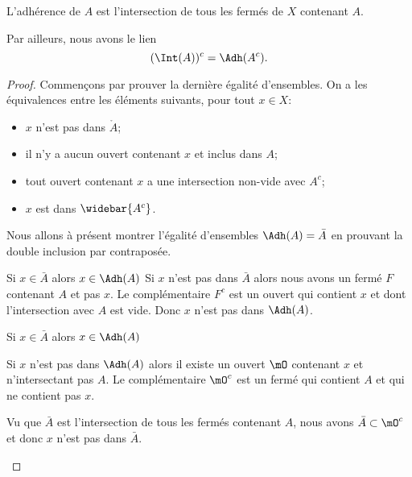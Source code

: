 \begin{lemma}       \label{LEMooILNCooOFZaTe}
    L'adhérence de \( A\) est l'intersection de tous les fermés de \( X\) contenant \( A\).

    Par ailleurs, nous avons le lien
    \begin{equation}
      (\Int(A))^c = \Adh(A^c).
    \end{equation}
\end{lemma}

\begin{proof}
    Commençons par prouver la dernière égalité d'ensembles. On a les équivalences entre les éléments suivants, pour tout $x \in X$:
    \begin{itemize}
    \item $x$ n'est pas dans $\mathring A$;
    \item il n'y a aucun ouvert contenant $x$ et inclus dans $A$;
    \item tout ouvert contenant $x$ a une intersection non-vide avec $A^c$;
    \item $x$ est dans $\widebar{A^c}$.
    \end{itemize}
    Nous allons à présent montrer l'égalité d'ensembles \( \Adh(A)=\bar A \) en prouvant la double inclusion par contraposée.
    \begin{subproof}
        \item[Si \( x\in \bar A\) alors \( x\in\Adh(A)\)]
            Si \( x\) n'est pas dans \( \bar A\) alors nous avons un fermé \( F\) contenant \( A\) et pas \( x\). Le complémentaire \( F^c\) est un ouvert qui contient \( x\) et dont l'intersection avec \( A\) est vide. Donc \( x\) n'est pas dans \( \Adh(A)\).

        \item[Si \( x\in\bar A\) alors \( x\in \Adh(A)\)]

            Si \( x\) n'est pas dans \( \Adh(A)\) alors il existe un ouvert \( \mO\) contenant \( x\) et n'intersectant pas \( A\). Le complémentaire \( \mO^c\) est un fermé qui contient \( A\) et qui ne contient pas \( x\).

            Vu que \( \bar A\) est l'intersection de tous les fermés contenant \( A\), nous avons \( \bar A\subset\mO^c\) et donc \( x\) n'est pas dans \( \bar A\).
    \end{subproof}
\end{proof}

